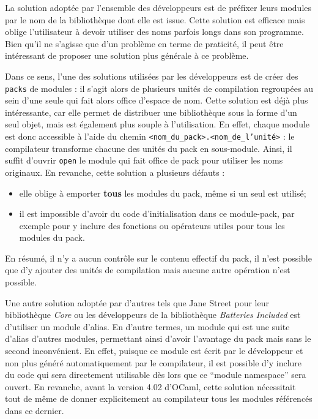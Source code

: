 \documentclass[11pt,a4paper]{report}
\begin{document}
La solution adoptée par l'ensemble des développeurs est de préfixer leurs
modules par le nom de la bibliothèque dont elle est issue. Cette solution est
efficace mais oblige l'utilisateur à devoir utiliser des noms parfois longs dans
son programme. Bien qu'il ne s'agisse que d'un problème en terme de praticité,
il peut être intéressant de proposer une solution plus générale à ce problème.

Dans ce sens, l'une des solutions utilisées par les développeurs est de créer
des \texttt{packs} de modules : il s'agit alors de plusieurs unités de
compilation regroupées au sein d'une seule qui fait alors office d'espace de
nom. Cette solution est déjà plus intéressante, car elle permet de distribuer
une bibliothèque sous la forme d'un seul objet, mais est également plus souple à
l'utilisation. En effet, chaque module est donc accessible à l'aide du chemin
\texttt{<nom\_du\_pack>.<nom\_de\_l'unité>} : le compilateur transforme chacune
des unités du pack en sous-module. Ainsi, il suffit d'ouvrir \texttt{open} le
module qui fait office de pack pour utiliser les noms originaux. En revanche,
cette solution a plusieurs défauts :
\begin{itemize}
\item elle oblige à emporter \textbf{tous} les modules du pack, même si un seul
  est utilisé;
\item il est impossible d'avoir du code d'initialisation dans ce module-pack,
  par exemple pour y inclure des fonctions ou opérateurs utiles pour tous les
  modules du pack.
\end{itemize}
En résumé, il n'y a aucun contrôle sur le contenu effectif du pack, il n'est
possible que d'y ajouter des unités de compilation mais aucune autre opération
n'est possible.

Une autre solution adoptée par d'autres tels que Jane Street pour leur
bibliothèque \emph{Core} ou les développeurs de la bibliothèque \emph{Batteries
  Included} est d'utiliser un module d'alias. En d'autre termes, un module qui
est une suite d'alias d'autres modules, permettant ainsi d'avoir l'avantage du
pack mais sans le second inconvénient. En effet, puisque ce module est écrit par
le développeur et non plus généré automatiquement par le compilateur, il est
possible d'y inclure du code qui sera directement utilisable dès lors que ce
``module namespace'' sera ouvert. En revanche, avant la version 4.02 d'OCaml,
cette solution nécessitait tout de même de donner explicitement au compilateur
tous les modules référencés dans ce dernier.
\end{document}
